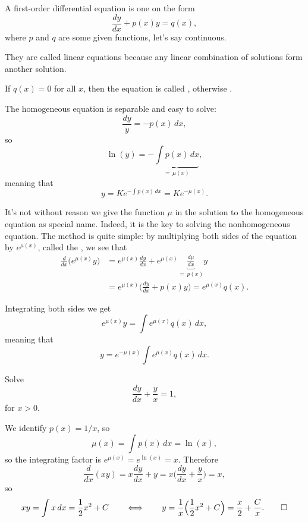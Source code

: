 
A first-order  differential equation is one on the form
\[
	\frac{d y}{d x} + p(x) y = q(x),
\]
where $p$ and $q$ are some given functions, let's say continuous.

They are called linear equations because any linear combination of solutions form another solution.

If $q(x) = 0$ for all $x$, then the equation is called , otherwise .

The homogeneous equation is separable and easy to solve:
\[
	\frac{d y}{y} = - p(x) \, d x,
\]
so
\[
	\ln(y) = - \underbrace{\int p(x) \, d x}_{=\, \mu(x)},
\]
meaning that
\[
	y = K e^{- \int p(x) \, d x} = K e^{-\mu(x)}.
\]

\noindent
It's not without reason we give the function $\mu$ in the solution to the homogeneous equation as special name.
Indeed, it is the key to solving the nonhomogeneous equation.
The method is quite simple: by multiplying both sides of the equation by $e^{\mu(x)}$, called the , we see that
\begin{align*}
	\frac{d}{d x} \big ( e^{\mu(x)} y \big ) &= e^{\mu(x)} \frac{d y}{d x} + e^{\mu(x)} \underbrace{\frac{d \mu}{d x}}_{=\, p(x)} y \\
	                                            &= e^{\mu(x)} \Big ( \frac{d y}{d x} + p(x) y \Big ) = e^{\mu(x)} q(x).
\end{align*}

\noindent
Integrating both sides we get
\[
	e^{\mu(x)} y = \int e^{\mu(x)} q(x) \, d x,
\]
meaning that
\[
	y = e^{-\mu(x)} \int e^{\mu(x)} q(x) \, d x.
\]

\begin{example}
	Solve
	\[
		\frac{d y}{d x} + \frac{y}{x} = 1,
	\]
	for $x > 0$.

	We identify $p(x) = 1/x$, so
	\[
		\mu(x) = \int p(x) \, d x = \ln(x),
	\]
	so the integrating factor is $e^{\mu(x)} = e^{\ln(x)} = x$.
	Therefore
	\[
		\frac{d}{d x} (x y) = x \frac{d y}{d x} + y = x \Big ( \frac{d y}{d x} + \frac{y}{x} \Big ) = x,
	\]
	so
	\[
		x y = \int x \, d x = \frac{1}{2} x^2 + C \qquad \Longleftrightarrow \qquad y = \frac{1}{x} \Big ( \frac{1}{2} x^2 + C \Big ) = \frac{x}{2} + \frac{C}{x}. \qedhere
	\]
\end{example}

